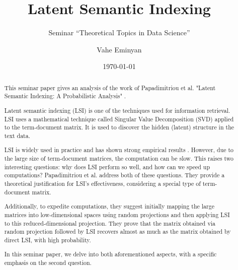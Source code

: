 \documentclass[a4paper,11pt,DIV=15]{scrartcl} %
\theoremstyle{plain}
\theoremstyle{definition}
\begin{document}
\subtitle{Seminar ``Theoretical Topics in Data Science''}
\date{\today}
\publishers{RWTH Aachen University}	%

\title{Latent Semantic Indexing}

\author{Vahe Eminyan}

\maketitle


\begin{abstract}
This seminar paper gives an analysis of the work of  Papadimitriou et al. "Latent Semantic Indexing: A Probabilistic Analysis" \cite{APAPADIMITRIOU2000217}.

Latent semantic indexing (LSI) is one of the techniques used for information retrieval.
LSI uses a mathematical technique called Singular Value Decomposition (SVD) applied to the term-document matrix. It is used to discover the hidden (latent) structure in the text data.

LSI is widely used in practice and has shown strong empirical results \cite{LSIusage1, LSIusage2, LSIusage3}. However, due to the large size of term-document matrices, the computation can be slow. This raises two interesting questions: why does LSI perform so well, and how can we speed up computations?
Papadimitriou et al. address both of these questions.
They provide a theoretical justification for LSI's effectiveness, considering a special type of term-document matrix.

Additionally, to expedite computations, they suggest initially mapping the large matrices into low-dimensional spaces using random projections and then applying LSI to this reduced-dimensional projection.
They prove that the matrix obtained via random projection followed by LSI recovers almost as
much as the matrix obtained by direct LSI, with high probability.

In this seminar paper, we delve into both aforementioned aspects, with a specific emphasis on the second question. 





\end{abstract}

\thispagestyle{empty}
\end{document}
